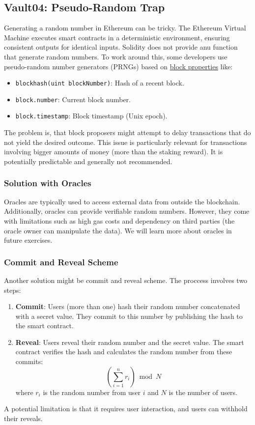 \documentclass[12pt]{article}
\begin{document}
\subsection*{Vault04: Pseudo-Random Trap}

Generating a random number in Ethereum can be tricky. The Ethereum Virtual Machine executes smart contracts in a deterministic environment, ensuring consistent outputs for identical inputs. Solidity does not provide anu function that generate random numbers. To work around this, some developers use pseudo-random number generators (PRNGs) based on \href{https://docs.soliditylang.org/en/latest/cheatsheet.html\#block-and-transaction-properties}{block properties} like:

\begin{itemize}
    \item \texttt{blockhash(uint blockNumber)}: Hash of a recent block.
    \item \texttt{block.number}: Current block number.
    \item \texttt{block.timestamp}: Block timestamp (Unix epoch).
\end{itemize}

\noindent
The problem is, that block proposers might attempt to delay transactions that do not yield the desired outcome. This issue is particularly relevant for transactions involving bigger amounts of money (more than the staking reward). It is potentially predictable and generally not recommended.

\subsubsection*{Solution with Oracles} Oracles are typically used to access external data from outside the blockchain. Additionally, oracles can provide verifiable random numbers. However, they come with limitations such as high gas costs and dependency on third parties (the oracle owner can manipulate the data). We will learn more about oracles in future exercises.

\subsubsection*{Commit and Reveal Scheme} Another solution might be commit and reveal scheme. The proccess involves two steps:
\begin{enumerate}
    \item \textbf{Commit}: Users (more than one) hash their random number concatenated with a secret value. They commit to this number by publishing the hash to the smart contract.
    \item \textbf{Reveal}: Users reveal their random number and the secret value. The smart contract verifies the hash and calculates the random number from these commits:
    \[
    \left( \sum_{i=1}^{n} r_i \right) \bmod N
    \]
    where $r_i$ is the random number from user $i$ and $N$ is the number of users.
\end{enumerate}
\noindent
A potential limitation is that it requires user interaction, and users can withhold their reveals.
\end{document}
